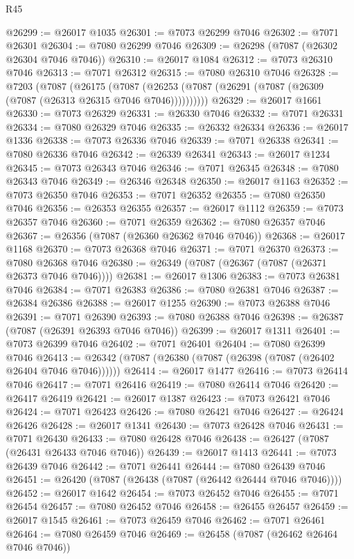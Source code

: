 \begin{lexlean}{R45}
\begin{coremodule}
{@26299 := @26017 @1035
@26301 := @7073 @26299 @7046
@26302 := @7071 @26301
@26304 := @7080 @26299 @7046
@26309 := @26298 (@7087 (@26302 @26304 @7046 @7046))
@26310 := @26017 @1084
@26312 := @7073 @26310 @7046
@26313 := @7071 @26312
@26315 := @7080 @26310 @7046
@26328 := @7203
    (@7087
      (@26175
        (@7087 (@26253 (@7087 (@26291 (@7087 (@26309 (@7087 (@26313 @26315 @7046 @7046))))))))))
@26329 := @26017 @1661
@26330 := @7073 @26329
@26331 := @26330 @7046
@26332 := @7071 @26331
@26334 := @7080 @26329 @7046
@26335 := @26332 @26334
@26336 := @26017 @1336
@26338 := @7073 @26336 @7046
@26339 := @7071 @26338
@26341 := @7080 @26336 @7046
@26342 := @26339 @26341
@26343 := @26017 @1234
@26345 := @7073 @26343 @7046
@26346 := @7071 @26345
@26348 := @7080 @26343 @7046
@26349 := @26346 @26348
@26350 := @26017 @1163
@26352 := @7073 @26350 @7046
@26353 := @7071 @26352
@26355 := @7080 @26350 @7046
@26356 := @26353 @26355
@26357 := @26017 @1112
@26359 := @7073 @26357 @7046
@26360 := @7071 @26359
@26362 := @7080 @26357 @7046
@26367 := @26356 (@7087 (@26360 @26362 @7046 @7046))
@26368 := @26017 @1168
@26370 := @7073 @26368 @7046
@26371 := @7071 @26370
@26373 := @7080 @26368 @7046
@26380 := @26349 (@7087 (@26367 (@7087 (@26371 @26373 @7046 @7046))))
@26381 := @26017 @1306
@26383 := @7073 @26381 @7046
@26384 := @7071 @26383
@26386 := @7080 @26381 @7046
@26387 := @26384 @26386
@26388 := @26017 @1255
@26390 := @7073 @26388 @7046
@26391 := @7071 @26390
@26393 := @7080 @26388 @7046
@26398 := @26387 (@7087 (@26391 @26393 @7046 @7046))
@26399 := @26017 @1311
@26401 := @7073 @26399 @7046
@26402 := @7071 @26401
@26404 := @7080 @26399 @7046
@26413 := @26342 (@7087 (@26380 (@7087 (@26398 (@7087 (@26402 @26404 @7046 @7046))))))
@26414 := @26017 @1477
@26416 := @7073 @26414 @7046
@26417 := @7071 @26416
@26419 := @7080 @26414 @7046
@26420 := @26417 @26419
@26421 := @26017 @1387
@26423 := @7073 @26421 @7046
@26424 := @7071 @26423
@26426 := @7080 @26421 @7046
@26427 := @26424 @26426
@26428 := @26017 @1341
@26430 := @7073 @26428 @7046
@26431 := @7071 @26430
@26433 := @7080 @26428 @7046
@26438 := @26427 (@7087 (@26431 @26433 @7046 @7046))
@26439 := @26017 @1413
@26441 := @7073 @26439 @7046
@26442 := @7071 @26441
@26444 := @7080 @26439 @7046
@26451 := @26420 (@7087 (@26438 (@7087 (@26442 @26444 @7046 @7046))))
@26452 := @26017 @1642
@26454 := @7073 @26452 @7046
@26455 := @7071 @26454
@26457 := @7080 @26452 @7046
@26458 := @26455 @26457
@26459 := @26017 @1545
@26461 := @7073 @26459 @7046
@26462 := @7071 @26461
@26464 := @7080 @26459 @7046
@26469 := @26458 (@7087 (@26462 @26464 @7046 @7046))
}
\end{coremodule}
\end{lexlean}
